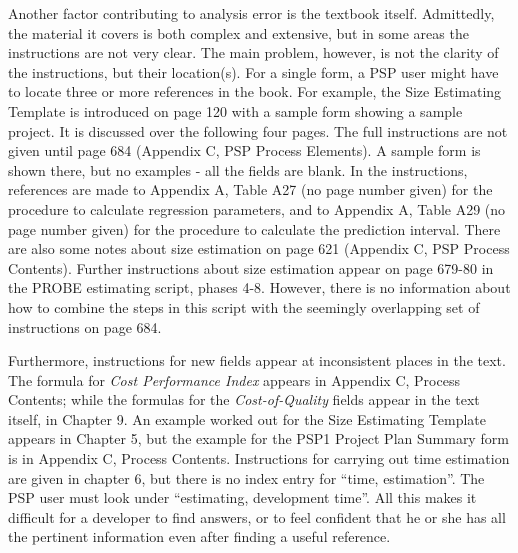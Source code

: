 Another factor contributing to analysis error is the textbook
\cite{Humphrey95} itself.  Admittedly, the material it covers is both
complex and extensive, but in some areas the instructions are not very
clear.  The main problem, however, is not the clarity of the instructions,
but their location(s).  For a single form, a PSP user might have to locate
three or more references in the book.  For example, the Size Estimating
Template is introduced on page 120 with a sample form showing a sample
project.  It is discussed over the following four pages.  The full
instructions are not given until page 684 (Appendix C, PSP Process
Elements).  A sample form is shown there, but no examples - all the fields
are blank.  In the instructions, references are made to Appendix A, Table
A27 (no page number given) for the procedure to calculate regression
parameters, and to Appendix A, Table A29 (no page number given) for the
procedure to calculate the prediction interval.  There are also some notes
about size estimation on page 621 (Appendix C, PSP Process Contents).
Further instructions about size estimation appear on page 679-80 in the
PROBE estimating script, phases 4-8.  However, there is no information
about how to combine the steps in this script with the seemingly
overlapping set of instructions on page 684.

Furthermore, instructions for new fields appear at inconsistent places in
the text.  The formula for {\it Cost Performance Index} appears in Appendix
C, Process Contents; while the formulas for the {\it Cost-of-Quality}
fields appear in the text itself, in Chapter 9.  An example worked out for
the Size Estimating Template appears in Chapter 5, but the example for the
PSP1 Project Plan Summary form is in Appendix C, Process Contents.
Instructions for carrying out time estimation are given in chapter 6, but
there is no index entry for ``time, estimation''.  The PSP user must look
under ``estimating, development time''.  All this makes it difficult for a
developer to find answers, or to feel confident that he or she has all the
pertinent information even after finding a useful reference.

